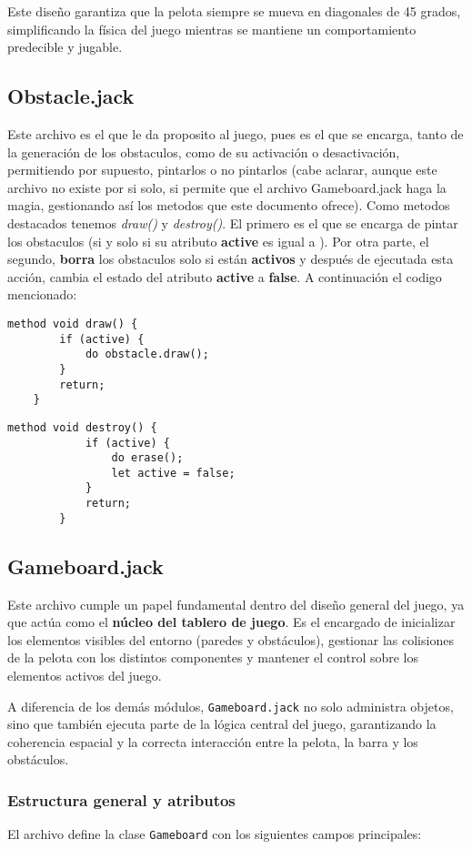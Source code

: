 \documentclass[twocolumn]{article}
\begin{document}
	Este diseño garantiza que la pelota siempre se mueva en diagonales de 45 grados, simplificando la física del juego mientras se mantiene un comportamiento predecible y jugable.
	\subsection{Obstacle.jack}
	Este archivo es el que le da proposito al juego, pues es el que se encarga, tanto de la generación de los obstaculos, como de su activación o desactivación, permitiendo por supuesto, pintarlos o no pintarlos (cabe aclarar, aunque este archivo no existe por si solo, si permite que el archivo Gameboard.jack haga la magia, gestionando así los metodos que este documento ofrece). Como metodos destacados tenemos \emph{draw()} y \emph{destroy()}. El primero es el que se encarga de pintar los obstaculos (si y solo si su atributo \textbf{active} es igual a ). Por otra parte, el segundo, \textbf{borra} los obstaculos solo si están \textbf{activos} y después de ejecutada esta acción, cambia el estado del atributo \textbf{active} a \textbf{false}. A continuación el codigo mencionado: 
	\begin{lstlisting}[caption=Método draw de los obstaculos]
	method void draw() {
		if (active) {
			do obstacle.draw();
		}
		return;
	}
	\end{lstlisting}
	\begin{lstlisting}[caption=Método destroy de los obstaculos]
		method void destroy() {
			if (active) {
				do erase();
				let active = false;
			}
			return;
		}
	\end{lstlisting}
	\subsection{Gameboard.jack}
	Este archivo cumple un papel fundamental dentro del diseño general del juego, ya que actúa como el \textbf{núcleo del tablero de juego}. Es el encargado de inicializar los elementos visibles del entorno (paredes y obstáculos), gestionar las colisiones de la pelota con los distintos componentes y mantener el control sobre los elementos activos del juego. 
	
	A diferencia de los demás módulos, \texttt{Gameboard.jack} no solo administra objetos, sino que también ejecuta parte de la lógica central del juego, garantizando la coherencia espacial y la correcta interacción entre la pelota, la barra y los obstáculos.
	
	\subsubsection{Estructura general y atributos}
	El archivo define la clase \texttt{Gameboard} con los siguientes campos principales:
	
\end{document}
